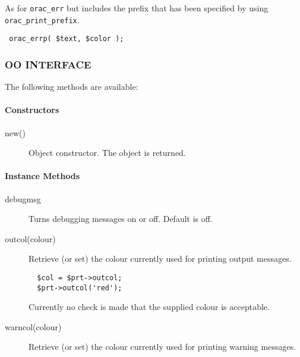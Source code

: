 \begin{description}
\begin{description}
As for \texttt{orac\_err} but includes the prefix that has been specified
by using \texttt{orac\_print\_prefix}.

\begin{verbatim}
 orac_errp( $text, $color );
\end{verbatim}
\end{description}
\subsubsection*{OO INTERFACE\label{ORAC::Print_OO_INTERFACE}}


The following methods are available:

\paragraph*{Constructors\label{ORAC::Print_Constructors}}
\begin{description}

\item[{new()}] \mbox{}

Object constructor. The object is returned.

\end{description}
\paragraph*{Instance Methods\label{ORAC::Print_Instance_Methods}}
\begin{description}

\item[{debugmsg}] \mbox{}

Turns debugging messages on or off. Default is off.


\item[{outcol(colour)}] \mbox{}

Retrieve (or set) the colour currently used for printing output
messages.

\begin{verbatim}
  $col = $prt->outcol;
  $prt->outcol('red');
\end{verbatim}


Currently no check is made that the supplied colour is acceptable.


\item[{warncol(colour)}] \mbox{}

Retrieve (or set) the colour currently used for printing warning
messages.


\end{description}
\end{description}
